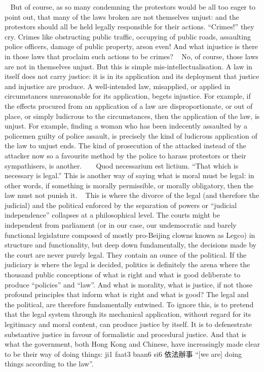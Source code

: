  
But of course, as so many condemning the protestors would be all too eager to point out, that many of the laws broken are not themselves unjust: and the protestors should all be held legally responsible for their actions. “Crimes!” they cry. Crimes like obstructing public traffic, occupying of public roads, assaulting police officers, damage of public property, arson even! And what injustice is there in those laws that proclaim such actions to be crimes?
 
No, of course, those laws are not in themselves unjust. But this is simple mis-intellectualisation. A law in itself does not carry justice: it is in its application and its deployment that justice and injustice are produce. A well-intended law, misapplied, or applied in circumstances unreasonable for its application, begets injustice. For example, if the effects procured from an application of a law are disproportionate, or out of place, or simply ludicrous to the circumstances, then the application of the law, is unjust. For example, finding a woman who has been indecently assaulted by a policemen guilty of police assault, is precisely the kind of ludicrous application of the law to unjust ends. The kind of prosecution of the attacked instead of the attacker now so a favourite method by the police to harass protestors or their sympathisers, is another.
 
 
Quod necessarium est lictium. “That which is necessary is legal.” This is another way of saying what is moral must be legal: in other words, if something is morally permissible, or morally obligatory, then the law must not punish it.
 
This is where the divorce of the legal (and therefore the judicial) and the political enforced by the separation of powers or “judicial independence” collapses at a philosophical level. The courts might be independent from parliament (or in our case, our undemocratic and barely functional legislature composed of mostly pro-Beijing clowns known as Legco) in structure and functionality, but deep down fundamentally, the decisions made by the court are never purely legal. They contain an ounce of the political. If the judiciary is where the legal is decided, politics is definitely the arena where the thousand public conceptions of what is right and what is good deliberate to produce “policies” and “law”. And what is morality, what is justice, if not those profound principles that inform what is right and what is good? The legal and the political, are therefore fundamentally entwined. To ignore this, is to pretend that the legal system through its mechanical application, without regard for its legitimacy and moral content, can produce justice by itself. It is to defenestrate substantive justice in favour of formalistic and procedural justice. And that is what the government, both Hong Kong and Chinese, have increasingly made clear to be their way of doing things: ji1 faat3 baan6 si6 依法辦事 “[we are] doing things according to the law”.
